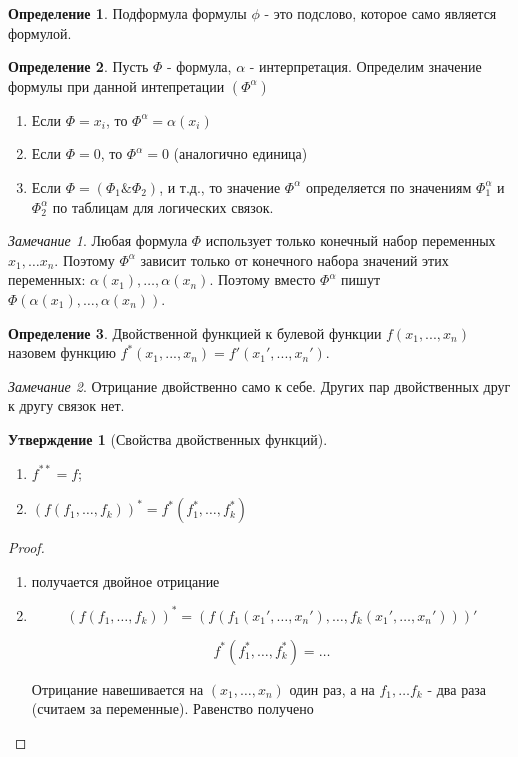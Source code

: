 \documentclass[a4paper]{article}
\theoremstyle{definition}
\newtheorem*{definition}{Определение}
\newtheorem*{statement}{Утверждение}
\theoremstyle{remark}
\newtheorem*{remark}{Замечание}
\begin{document}
    \begin{definition}
        Подформула формулы $\phi$ - это подслово, которое само является
    формулой.
    \end{definition}
    \begin{definition}
        Пусть $\Phi$ - формула, $\alpha$ - интерпретация.
        Определим значение формулы при данной интепретации $(\Phi^\alpha)$
        \begin{enumerate}
            \item Если $\Phi = x_i$, то $\Phi^\alpha = \alpha(x_i)$
            \item Если $\Phi = 0$, то $\Phi^\alpha = 0$ (аналогично единица)
            \item Если $\Phi = (\Phi_1 \& \Phi_2)$, и т.д., то значение $\Phi^\alpha$
            определяется по значениям $\Phi_1^\alpha$ и $\Phi_2^\alpha$ по таблицам для логических связок.
        \end{enumerate}
    \end{definition}
    \begin{remark}
        Любая формула $\Phi$ использует только конечный набор переменных $x_1, \dots x_n$. Поэтому $\Phi^\alpha$ зависит только от конечного
        набора значений этих переменных: $\alpha(x_1), \dots, \alpha(x_n)$. Поэтому вместо $\Phi^\alpha$ пишут $\Phi(\alpha(x_1), \dots, \alpha(x_n))$.
    \end{remark}
    \begin{definition}
        Двойственной функцией к булевой функции $f(x_1, ..., x_n)$ назовем функцию 
        $f^*(x_1, ..., x_n) = f'(x_1', ..., x_n')$.
    \end{definition}
    \begin{remark}
        Отрицание двойственно само к себе. Других пар двойственных
друг к другу связок нет.
    \end{remark}
    \begin{statement}[Свойства двойственных функций]
        \begin{enumerate}
            \item $f^{**} = f$;
            \item $(f(f_1, \dots, f_k))^* = f^*(f_1^*, \dots, f_k^*)$
        \end{enumerate}
    \end{statement}
    \begin{proof}
        \begin{enumerate}
            \item получается двойное отрицание
            \item $$(f(f_1, \dots, f_k))^* = (f(f_1(x_1', \dots, x_n'), \dots, f_k(x_1', \dots, x_n')))'$$
            
            $$f^*(f_1^*, \dots, f_k^*) = \dots$$

            Отрицание навешивается на $(x_1, \dots, x_n)$ один раз, а на $f_1, \dots f_k$ - два раза (считаем за переменные). Равенство получено
        \end{enumerate}
    \end{proof}
\end{document}
